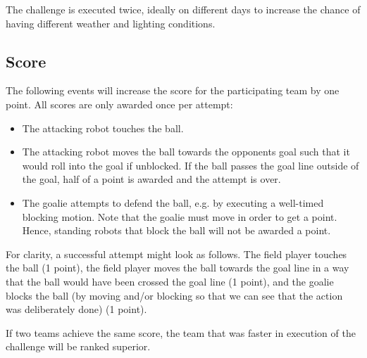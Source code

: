 \documentclass[12pt]{article}
\begin{document}
The challenge is executed twice, ideally on different days to increase the chance of having different weather and lighting conditions.

\subsection{Score}
The following events will increase the score for the participating team by one point. All scores are only awarded once per attempt:

\begin{itemize}
\item The attacking robot touches the ball. 
\item The attacking robot moves the ball towards the opponents goal such that it would roll into the goal if unblocked. If the ball passes the goal line outside of the goal, half of a point is awarded and the attempt is over.
\item The goalie attempts to defend the ball, e.g. by executing a well-timed blocking motion. Note that the goalie must move in order to get a point. Hence, standing robots that block the ball will not be awarded a point.
\end{itemize}

For clarity, a successful attempt might look as follows.  The field player touches the ball (1 point), the field player moves the ball towards the goal line in a way that the ball would have been crossed the goal line (1 point), and the goalie blocks the ball (by moving and/or blocking so that we can see that the action was deliberately done) (1 point).

If two teams achieve the same score, the team that was faster in execution of the challenge will be ranked superior.
\end{document}
